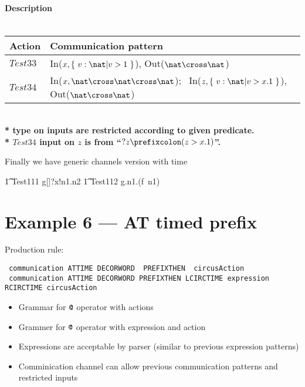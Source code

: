 \documentclass{article}
\begin{document}
\paragraph{Description \\ \\}

\vspace{2pt}
\begin{tabular}{l|l}
   \hline
   Action   & Communication pattern \\
   \hline
   $Test33$  & In($x, \{~ v: \nat | v > 1 ~\}$), Out($\nat \cross \nat$) \\
   \hline
   $Test34$  & In($x, \nat \cross \nat \cross \nat$);~ In($z, \{~ v: \nat | v > x.1 ~\}$), Out($\nat \cross \nat$) \\
   \hline
\end{tabular}
\\

\textbf{* type on inputs are restricted according to given predicate.}
\\
\indent \textbf{* $Test34$ input on $z$ is from ``$?z \prefixcolon (z > x.1)$''.}

Finally we have generic channels version with time
%
\begin{circusaction}
   \t1 Test111 \circdef g[\nat \cross \nat \cross \nat]?x!n1.n2 \then {} \rcirctime 
   \Skip
   \also
   \t1 Test112 \circdef g.n1.(f~n1) \then {} \rcirctime \Skip 
\end{circusaction}


\section{Example 6 --- AT timed prefix}

Production rule:
\begin{verbatim}
 communication ATTIME DECORWORD  PREFIXTHEN  circusAction
 communication ATTIME DECORWORD PREFIXTHEN LCIRCTIME expression RCIRCTIME circusAction
\end{verbatim}

\begin{itemize}
	\item Grammar for ${\hbox{\texttt{@}}}$ operator with actions
	\item Grammer for ${\hbox{\texttt{@}}}$ operator with expression and action 
	\item Expressions are acceptable by parser (similar to previous expression patterns)
	\item Comminication channel can allow previous communication patterns and restricted inputs 
\end{itemize}
\end{document}
